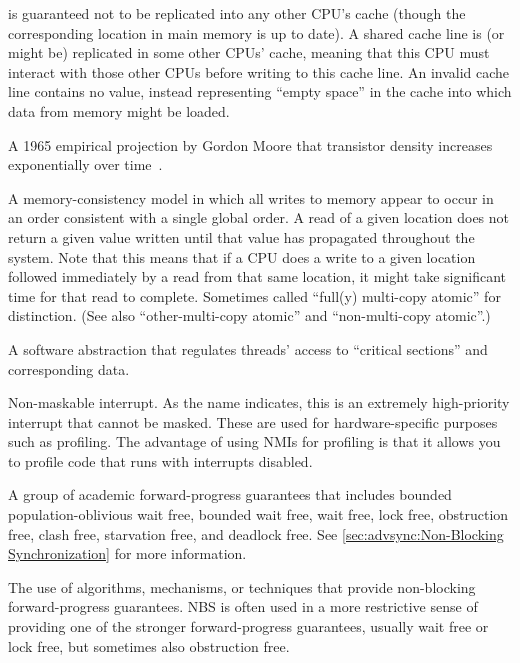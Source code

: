 \begin{description}
	is guaranteed not to be replicated into any other CPU's cache
	(though the corresponding location in main memory is up to date).
	A shared cache line is (or might be) replicated in some other
	CPUs' cache, meaning that this CPU must interact with those other
	CPUs before writing to this cache line.
	An invalid cache line contains no value, instead representing
	``empty space'' in the cache into which data from memory might
	be loaded.
\item[\IXGaltr{Moore's Law}{Moore's Law}:]
	A 1965 empirical projection by Gordon Moore that
	transistor density increases exponentially over
	time~\cite{GordonMoore1965MooresLaw}.
\item[\IXG{Multi-Copy Atomic}:]
	A memory-consistency model in which all writes to memory appear
	to occur in an order consistent with a single global order.
	A read of a given location does not return a given value written
	until that value has propagated throughout the system.
	Note that this means that if a CPU does a write to a given
	location followed immediately by a read from that same location,
	it might take significant time for that read to complete.
	Sometimes called ``full(y) multi-copy atomic'' for distinction.
	(See also ``other-multi-copy atomic'' and ``non-multi-copy atomic''.)
\item[\IXG{Mutual-Exclusion Mechanism}:]
	A software abstraction that regulates threads' access to
	``critical sections'' and corresponding data.
\item[NMI:]
	Non-maskable interrupt.
	As the name indicates, this is an extremely high-priority
	interrupt that cannot be masked.
	These are used for hardware-specific purposes such as profiling.
	The advantage of using NMIs for profiling is that it allows you
	to profile code that runs with interrupts disabled.
\item[\IXG{Non-Blocking}:]
	A group of academic forward-progress guarantees that includes
	bounded population-oblivious wait free,
	bounded wait free,
	wait free,
	lock free,
	obstruction free,
	clash free,
	starvation free, and
	deadlock free.
	See \cref{sec:advsync:Non-Blocking Synchronization}
	for more information.
\item[Non-Blocking Synchronization (NBS):]
	The use of algorithms, mechanisms, or techniques that provide
	non-blocking forward-progress guarantees.
	NBS is often used in a more restrictive sense of providing one
	of the stronger forward-progress guarantees, usually wait free or
	lock free, but sometimes also obstruction free.

\end{description}

